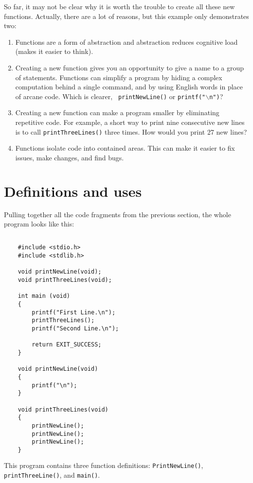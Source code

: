 So far, it may not be clear why it is worth the trouble to
create all these new functions.  Actually, there are a lot
of reasons, but this example only demonstrates two:

\begin{enumerate}
\item Functions are a form of abstraction and abstraction reduces cognitive load (makes it easier to think).

\item Creating a new function gives you an opportunity to
give a name to a group of statements. Functions can simplify a program
by hiding a complex computation behind a single command, and by using
English words in place of arcane code.  Which is clearer, {\tt
printNewLine()} or {\tt printf("$\backslash$n")}?

\item Creating a new function can make a program smaller by eliminating
repetitive code.  For example, a short way to print nine consecutive
new lines is to call {\tt printThreeLines()} three times.  How would you
print 27 new lines?

\item Functions isolate code into contained areas. This can make it easier to fix issues, make changes, and find bugs.

\end{enumerate}

\section {Definitions and uses}

Pulling together all the code fragments from the previous
section, the whole program looks like this:

\begin{verbatim}

    #include <stdio.h>
    #include <stdlib.h>

    void printNewLine(void);
    void printThreeLines(void);
    
    int main (void)
    {
        printf("First Line.\n");
        printThreeLines();
        printf("Second Line.\n");
        
        return EXIT_SUCCESS;
    }

    void printNewLine(void) 
    {
        printf("\n");
    }

    void printThreeLines(void)
    {
        printNewLine();  
        printNewLine();  
        printNewLine();
    }

\end{verbatim}
%
This program contains three function definitions: {\tt PrintNewLine()},
{\tt printThreeLine()}, and {\tt main()}.


